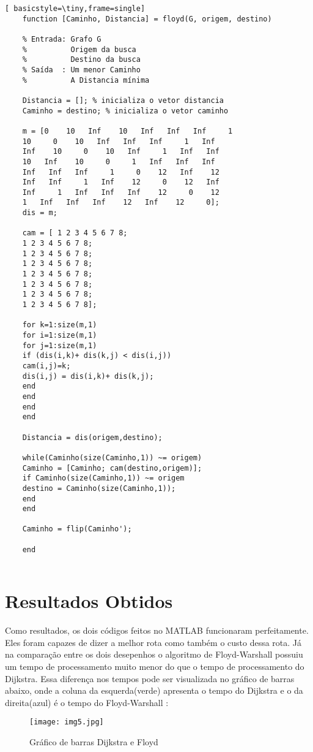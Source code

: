 \documentclass[
12pt,				%
openright,			%
oneside,			%
a4paper,			%
english,			%
french,				%
spanish,			%
brazil,				%
]{abntex2}
\begin{document}
	\begin{lstlisting}[ basicstyle=\tiny,frame=single]
	function [Caminho, Distancia] = floyd(G, origem, destino)
	
	% Entrada: Grafo G
	%          Origem da busca
	%          Destino da busca
	% Saída  : Um menor Caminho
	%          A Distancia mínima
	
	Distancia = []; % inicializa o vetor distancia
	Caminho = destino; % inicializa o vetor caminho
	
	m = [0    10   Inf    10   Inf   Inf   Inf     1
	10     0    10   Inf   Inf   Inf     1   Inf
	Inf    10     0    10   Inf     1   Inf   Inf
	10   Inf    10     0     1   Inf   Inf   Inf
	Inf   Inf   Inf     1     0    12   Inf    12
	Inf   Inf     1   Inf    12     0    12   Inf
	Inf     1   Inf   Inf   Inf    12     0    12
	1   Inf   Inf   Inf    12   Inf    12     0];
	dis = m;
	
	cam = [ 1 2 3 4 5 6 7 8;
	1 2 3 4 5 6 7 8;
	1 2 3 4 5 6 7 8;
	1 2 3 4 5 6 7 8;
	1 2 3 4 5 6 7 8;
	1 2 3 4 5 6 7 8;
	1 2 3 4 5 6 7 8;
	1 2 3 4 5 6 7 8];
	
	for k=1:size(m,1)
	for i=1:size(m,1)
	for j=1:size(m,1)
	if (dis(i,k)+ dis(k,j) < dis(i,j))
	cam(i,j)=k;
	dis(i,j) = dis(i,k)+ dis(k,j);
	end
	end
	end
	end
	
	Distancia = dis(origem,destino);
	
	while(Caminho(size(Caminho,1)) ~= origem)
	Caminho = [Caminho; cam(destino,origem)];
	if Caminho(size(Caminho,1)) ~= origem
	destino = Caminho(size(Caminho,1));
	end
	end
	
	Caminho = flip(Caminho');
	
	end
	
	\end{lstlisting}
	
	\chapter{Resultados Obtidos}
	Como resultados, os dois códigos feitos no MATLAB funcionaram perfeitamente. Eles foram capazes de dizer a melhor rota como também o custo dessa rota. Já na comparação entre os dois desepenhos o algoritmo de Floyd-Warshall possuiu um tempo de processamento muito menor do que o tempo de processamento do Dijkstra. Essa diferença nos tempos pode ser visualizada no gráfico de barras abaixo, onde a coluna da esquerda(verde) apresenta o tempo do Dijkstra e o da direita(azul) é o tempo do Floyd-Warshall :
	
	\begin{figure}[h!]
		\centering
		\texttt{[image: img5.jpg]}
		\caption{Gráfico de barras Dijkstra e Floyd}
		\label{img5}
	\end{figure}
	
\end{document}
